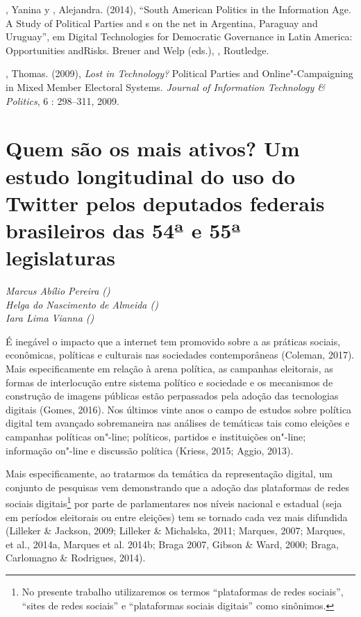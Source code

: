 \begin{Parskip}
, Yanina y , Alejandra. (2014), ``South American Politics in
the Information Age. A Study of Political Parties and s on the net in
Argentina, Paraguay and Uruguay'', em Digital Technologies for
Democratic Governance in Latin America: Opportunities andRisks. Breuer
and Welp (eds.), , Routledge.

, Thomas. (2009), \emph{Lost in Technology?} Political Parties and
Online"-Campaigning in Mixed Member Electoral Systems. \emph{Journal of
Information Technology \& Politics}, 6 : 298--311, 2009.
\end{Parskip}


\chapter*{Quem são os mais ativos? Um estudo longitudinal do uso do
Twitter pelos deputados federais brasileiros das 54ª e 55ª legislaturas}

\begin{flushright}
\emph{Marcus Abílio Pereira ()\\Helga do Nascimento de Almeida ()\\Iara Lima Vianna ()}
\end{flushright}

É inegável o impacto que a internet tem promovido sobre a as práticas
sociais, econômicas, políticas e culturais nas sociedades contemporâneas
(Coleman, 2017). Mais especificamente em relação à arena política, as
campanhas eleitorais, as formas de interlocução entre sistema político e
sociedade e os mecanismos de construção de imagens públicas estão
perpassados pela adoção das tecnologias digitais (Gomes, 2016). Nos
últimos vinte anos o campo de estudos sobre política digital tem
avançado sobremaneira nas análises de temáticas tais como eleições e
campanhas políticas on"-line; políticos, partidos e instituições on"-line;
informação on"-line e discussão política (Kriess, 2015; Aggio, 2013).

Mais especificamente, ao tratarmos da temática da representação digital,
um conjunto de pesquisas vem demonstrando que a adoção das plataformas
de redes sociais digitais\footnote{No presente trabalho utilizaremos os
  termos ``plataformas de redes sociais'', ``sites de redes sociais'' e
  ``plataformas sociais digitais'' como sinônimos.} por parte de
parlamentares nos níveis nacional e estadual (seja em períodos
eleitorais ou entre eleições) tem se tornado cada vez mais difundida
(Lilleker \& Jackson, 2009; Lilleker \& Michalska, 2011; Marques, 2007;
Marques, et al., 2014a, Marques et al. 2014b; Braga 2007, Gibson \&
Ward, 2000; Braga, Carlomagno \& Rodrigues, 2014).

